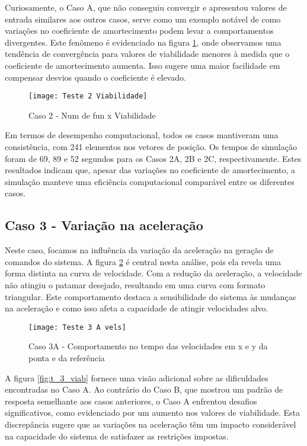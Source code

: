 Curiosamente, o Caso A, que não conseguiu convergir e apresentou valores de entrada similares aos outros casos, serve como um exemplo notável de como variações no coeficiente de amortecimento podem levar a comportamentos divergentes. Este fenômeno é evidenciado na figura \ref{fig:t_2_viab}, onde observamos uma tendência de convergência para valores de viabilidade menores à medida que o coeficiente de amortecimento aumenta. Isso sugere uma maior facilidade em compensar desvios quando o coeficiente é elevado.

\begin{figure}[H]
    \begin{center}
    \caption{Caso 2 - Num de fun x Viabilidade}
    \texttt{[image: Teste 2 Viabilidade]}
    \label{fig:t_2_viab}
    \end{center}
\end{figure}

Em termos de desempenho computacional, todos os casos mantiveram uma consistência, com 241 elementos nos vetores de posição. Os tempos de simulação foram de 69, 89 e 52 segundos para os Casos 2A, 2B e 2C, respectivamente. Estes resultados indicam que, apesar das variações no coeficiente de amortecimento, a simulação manteve uma eficiência computacional comparável entre os diferentes casos.

\subsection{Caso 3 - Variação na aceleração}
Neste caso, focamos na influência da variação da aceleração na geração de comandos do sistema. A figura \ref{fig:t_3a_vels} é central nesta análise, pois ela revela uma forma distinta na curva de velocidade. Com a redução da aceleração, a velocidade não atingiu o patamar desejado, resultando em uma curva com formato triangular. Este comportamento destaca a sensibilidade do sistema às mudanças na aceleração e como isso afeta a capacidade de atingir velocidades alvo.

\begin{figure}[H]
    \begin{center}
    \caption{Caso 3A - Comportamento no tempo das velocidades em x e y da ponta e da referência}
    \texttt{[image: Teste 3 A vels]}
    \label{fig:t_3a_vels}
    \end{center}
\end{figure}

A figura \ref{fig:t_3_viab} fornece uma visão adicional sobre as dificuldades encontradas no Caso A. Ao contrário do Caso B, que mostrou um padrão de resposta semelhante aos casos anteriores, o Caso A enfrentou desafios significativos, como evidenciado por um aumento nos valores de viabilidade. Esta discrepância sugere que as variações na aceleração têm um impacto considerável na capacidade do sistema de satisfazer as restrições impostas.

